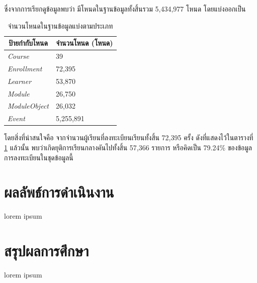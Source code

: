 \documentclass[conference]{IEEEtran}
\def\dropout{ยุติการเรียนกลางคัน}
\newcommand*{\thead}[1]{\multicolumn{1}{c}{\bfseries #1}}
\begin{document}
    ซึ่งจากการเรียกดูข้อมูลพบว่า มีโหนดในฐานข้อมูลทั้งสิ้นรวม 5,434,977 โหนด โดยแบ่งออกเป็น 
    \begin{table}[ht!]
        \caption[nodecountinfo]{จำนวนโหนดในฐานข้อมูลแบ่งตามประเภท}
        \label{tab:node-details}
        \begin{tabular}{p{3cm} p{5cm}}
            \hline
            \thead{ป้ายกำกับโหนด}   & \thead{จำนวนโหนด (โหนด)} \\
            \hline
            \textit{Course}         & 39 \\
            \textit{Enrollment}     & 72,395 \\
            \textit{Learner}        & 53,870 \\
            \textit{Module}         & 26,750 \\
            \textit{ModuleObject}   & 26,032 \\
            \textit{Event}          & 5,255,891 \\
            \hline
        \end{tabular}
    \end{table}

    โดยสิ่งที่น่าสนใจคือ จากจำนวนผู้เรียนที่ลงทะเบียนเรียนทั้งสิ้น 72,395 ครั้ง 
    ดังที่แสดงไว้ในตารางที่ \ref{tab:node-details} แล้วนั้น พบว่าเกิด{\dropout}ไปทั้งสิ้น
    57,366 รายการ หรือคิดเป็น 79.24\% ของข้อมูลการลงทะเบียนในชุดข้อมูลนี้

    \section[result]{ผลลัพธ์การดำเนินงาน}
    lorem ipsum

    \section[conclusions]{สรุปผลการศึกษา}
    lorem ipsum

    
    
\end{document}
